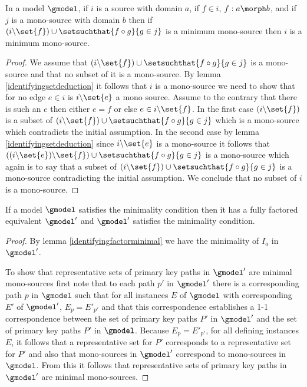 \begin{lemma}
\label{identifyingfactorminimal}
In a model $\gmodel$, if $i$ is a source with domain $a$,
if $f \in i$, $f: a \morph b$, 
and if $j$ is a mono-source with domain $b$
then  if $(i \backslash \set{f}) \cup \setsuchthat{f \circ g}{g \in j}$ is a minimum mono-source
then $i$ is a minimum mono-source.
\end{lemma}
\begin{proof}
We assume that $(i \backslash \set{f}) \cup \setsuchthat{f \circ g}{g \in j}$ is a mono-source and that no subset of it is a mono-source.
By lemma \ref{identifyingsetdeduction} it follows that $i$ is a mono-source we need to show that
for no edge $e \in i$ is $i \backslash \set{e}$ a mono source. Assume to the contrary that there is such an $e$ then  either $e = f$ or else
$e \in i \backslash \set{f}$. In the first case $(i \backslash \set{f})$ is a subset of  $(i \backslash \set{f}) \cup \setsuchthat{f \circ g}{g \in j}$ which is a mono-source which contradicts the initial assumption. In the second  case 
by lemma \ref{identifyingsetdeduction} since $i \backslash \set{e}$ is a mono-source it follows that
$((i \backslash \set{e})\backslash \set{f}) \cup \setsuchthat{f \circ g}{g \in j}$ is a mono-source which again is to say that a subset
of $(i \backslash \set{f}) \cup \setsuchthat{f \circ g}{g \in j}$ is a mono-source contradicting the initial assumption.
We conclude that no subset of $i$ is a mono-source.
\end{proof}

\begin{lemma}
If a model $\gmodel$ satisfies the minimality condition then it has a fully factored
equivalent $\gmodel'$  and $\gmodel'$ satisfies the minimality condition. 
\end{lemma}
\begin{proof}
By lemma \ref{identifyingfactorminimal} we have the minimality of $I_a$ in $\gmodel'$.

To show that representative sets of primary key paths in $\gmodel'$ are minimal mono-sources
first note that to each path $p'$ in $\gmodel'$ there is a corresponding path 
$p$ in $\gmodel$  
 such that for all instances $E$ of $\gmodel$ with corresponding $E'$ of $\gmodel'$, 
$E_p=E'_{p'}$ and that this correspondence establishes a 1-1 correspondence between the set of primary key paths $P'$ in $\gmodel'$
and the set of primary key paths $P'$ in $\gmodel$. Because $E_p=E'_{p'}$, for all defining instances
$E$, it follows that a representative set for $P'$ corresponds to a representative set for $P'$ and also
that mono-sources in $\gmodel'$ correspond to mono-sources in $\gmodel$. From this it follows that representative sets of primary key paths in $\gmodel'$ are minimal mono-sources.
\end{proof}
